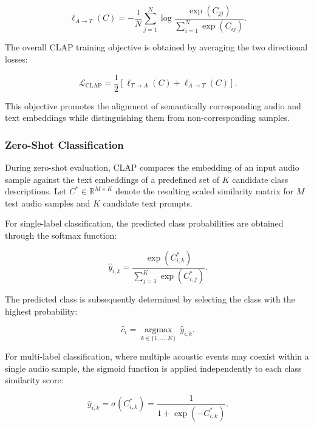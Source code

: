 \documentclass[pdflatex,sn-mathphys-num]{sn-jnl}%
\theoremstyle{thmstyleone}%
\theoremstyle{thmstyletwo}%
\theoremstyle{thmstylethree}%
\begin{document}
\begin{equation}
\ell_{A \rightarrow T}(C)
=
-\frac{1}{N}
\sum_{j=1}^{N}
\log
\frac{\exp(C_{jj})}
{\sum_{i=1}^{N}\exp(C_{ij})}.
\label{eq:clap_a2t}
\end{equation}

The overall CLAP training objective is obtained by averaging the two directional losses:

\begin{equation}
\mathcal{L}_{\mathrm{CLAP}}
=
\frac{1}{2}
\left[
\ell_{T \rightarrow A}(C)
+
\ell_{A \rightarrow T}(C)
\right].
\label{eq:clap_total}
\end{equation}

This objective promotes the alignment of semantically corresponding audio and text embeddings while distinguishing them from non-corresponding samples.

\subsubsection{Zero-Shot Classification}

During zero-shot evaluation, CLAP compares the embedding of an input audio sample against the text embeddings of a predefined set of $K$ candidate class descriptions. Let $C^{*} \in \mathbb{R}^{M \times K}$ denote the resulting scaled similarity matrix for $M$ test audio samples and $K$ candidate text prompts.

For single-label classification, the predicted class probabilities are obtained through the softmax function:

\begin{equation}
\hat{y}_{i,k}
=
\frac{\exp(C^{*}_{i,k})}
{\sum_{j=1}^{K}\exp(C^{*}_{i,j})}.
\label{eq:clap_softmax}
\end{equation}

The predicted class is subsequently determined by selecting the class with the highest probability:

\begin{equation}
\hat{c}_i
=
\underset{k \in \{1,\ldots,K\}}{\operatorname{argmax}}
\ \hat{y}_{i,k}.
\label{eq:clap_prediction}
\end{equation}

For multi-label classification, where multiple acoustic events may coexist within a single audio sample, the sigmoid function is applied independently to each class similarity score:

\begin{equation}
\hat{y}_{i,k}
=
\sigma(C^{*}_{i,k})
=
\frac{1}{1+\exp(-C^{*}_{i,k})}.
\label{eq:clap_sigmoid}
\end{equation}
\end{document}
